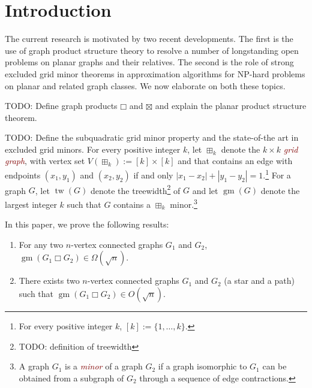 \documentclass[lotsofwhite]{patmorin}
\newcommand{\defn}[1]{\textcolor{Maroon}{\emph{#1}}}
\newcommand{\boxprod}{\mathbin{\Box}}
\DeclareMathOperator{\tw}{tw}
\DeclareMathOperator{\gm}{gm}
\theoremstyle{plain}
\theoremstyle{definition}
\begin{document}



\section{Introduction}

The current research is motivated by two recent developments. The first is the use of graph product structure theory to resolve a number of longstanding open problems on planar graphs and their relatives.  The second is the role of strong excluded grid minor theorems in approximation algorithms for NP-hard problems on planar and related graph classes.  We now elaborate on both these topics.

TODO: Define graph products $\boxprod$ and $\boxtimes$ and explain the planar product structure theorem.

TODO: Define the subquadratic grid minor property and the state-of-the art in excluded grid minors.
For every positive integer $k$, let $\boxplus_k$ denote the $k\times k$ \defn{grid graph}, with vertex set $V(\boxplus_k):=[k]\times[k]$ and that contains an edge with endpoints $(x_1,y_1)$ and $(x_2,y_2)$ if and only $|x_1-x_2| + |y_1-y_2|=1$.\footnote{For every positive integer $k$, $[k]:=\{1,\ldots,k\}$.}  For a graph $G$, let $\tw(G)$ denote the treewidth\footnote{TODO: definition of treewidth} of $G$ and let $\gm(G)$ denote the largest integer $k$ such that $G$ contains a $\boxplus_k$ minor.\footnote{A graph $G_1$ is a \defn{minor} of a graph $G_2$ if a graph isomorphic to $G_1$ can be obtained from a subgraph of $G_2$ through a sequence of edge contractions.}

In this paper, we prove the following results:

\begin{enumerate}
   \item  For any two $n$-vertex connected graphs $G_1$ and $G_2$, $\gm(G_1\boxprod G_2) \in \Omega(\sqrt{n})$.
   \item There exists two $n$-vertex connected graphs $G_1$ and $G_2$ (a star and a path) such that $\gm(G_1\boxprod G_2) \in O(\sqrt{n})$.
\end{enumerate}
\end{document}
